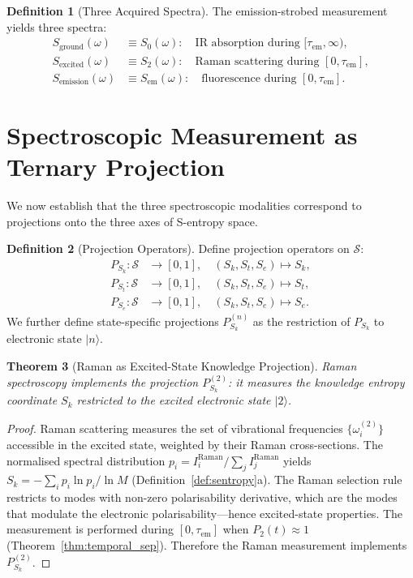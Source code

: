 \documentclass[11pt,twocolumn,a4paper]{article}
\newtheorem{theorem}{Theorem}[section]
\theoremstyle{definition}
\newtheorem{definition}[theorem]{Definition}
\theoremstyle{remark}
\newcommand{\Sk}{S_k}
\newcommand{\St}{S_t}
\newcommand{\Se}{S_e}
\newcommand{\Sspace}{\mathcal{S}}
\begin{document}
\begin{definition}[Three Acquired Spectra]
\label{def:three_spectra}
The emission-strobed measurement yields three spectra:
\begin{align}
S_{\mathrm{ground}}(\omega) &\equiv S_0(\omega): \quad \text{IR absorption during } [\tau_{\mathrm{em}}, \infty), \\
S_{\mathrm{excited}}(\omega) &\equiv S_2(\omega): \quad \text{Raman scattering during } [0, \tau_{\mathrm{em}}], \\
S_{\mathrm{emission}}(\omega) &\equiv S_{\mathrm{em}}(\omega): \quad \text{fluorescence during } [0, \tau_{\mathrm{em}}].
\end{align}
\end{definition}

\section{Spectroscopic Measurement as Ternary Projection}
\label{sec:projection}

We now establish that the three spectroscopic modalities correspond to projections onto the three axes of S-entropy space.

\begin{definition}[Projection Operators]
\label{def:projections}
Define projection operators on $\Sspace$:
\begin{align}
P_{\Sk}: \Sspace &\to [0,1], \quad (\Sk, \St, \Se) \mapsto \Sk, \\
P_{\St}: \Sspace &\to [0,1], \quad (\Sk, \St, \Se) \mapsto \St, \\
P_{\Se}: \Sspace &\to [0,1], \quad (\Sk, \St, \Se) \mapsto \Se.
\end{align}
We further define state-specific projections $P_{\Sk}^{(n)}$ as the restriction of $P_{\Sk}$ to electronic state $|n\rangle$.
\end{definition}

\begin{theorem}[Raman as Excited-State Knowledge Projection]
\label{thm:raman_proj}
Raman spectroscopy implements the projection $P_{\Sk}^{(2)}$: it measures the knowledge entropy coordinate $\Sk$ restricted to the excited electronic state $|2\rangle$.
\end{theorem}

\begin{proof}
Raman scattering measures the set of vibrational frequencies $\{\omega_i^{(2)}\}$ accessible in the excited state, weighted by their Raman cross-sections. The normalised spectral distribution $p_i = I_i^{\mathrm{Raman}} / \sum_j I_j^{\mathrm{Raman}}$ yields $\Sk = -\sum_i p_i \ln p_i / \ln M$ (Definition~\ref{def:sentropy}a). The Raman selection rule restricts to modes with non-zero polarisability derivative, which are the modes that modulate the electronic polarisability---hence excited-state properties. The measurement is performed during $[0, \tau_{\mathrm{em}}]$ when $P_2(t) \approx 1$ (Theorem~\ref{thm:temporal_sep}). Therefore the Raman measurement implements $P_{\Sk}^{(2)}$.
\end{proof}
\end{document}
